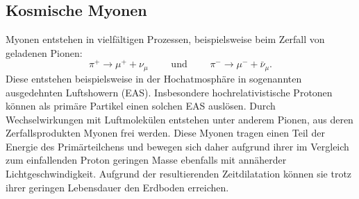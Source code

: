   \subsection{Kosmische Myonen}
  Myonen entstehen in vielfältigen Prozessen, beispielsweise beim Zerfall von geladenen
  Pionen:
  \begin{equation*}
    \pi^+ \to \mu^+ + \nu_{\mu} \qquad \text{ und } \qquad \pi^- \to \mu^- + \bar{\nu}_{\mu} .
  \end{equation*}
  Diese entstehen beispielsweise in der Hochatmosphäre in sogenannten ausgedehnten
  Luftshowern (EAS). Insbesondere hochrelativistische Protonen können als primäre
  Partikel einen solchen EAS auslösen. Durch Wechselwirkungen mit Luftmolekülen
  entstehen unter anderem Pionen, aus deren Zerfallsprodukten Myonen frei werden.
  Diese Myonen tragen einen Teil der Energie des Primärteilchens und bewegen sich
  daher aufgrund ihrer im Vergleich zum einfallenden Proton geringen Masse ebenfalls mit
  annäherder Lichtgeschwindigkeit. Aufgrund der resultierenden Zeitdilatation
  können sie trotz ihrer geringen Lebensdauer den Erdboden erreichen.
